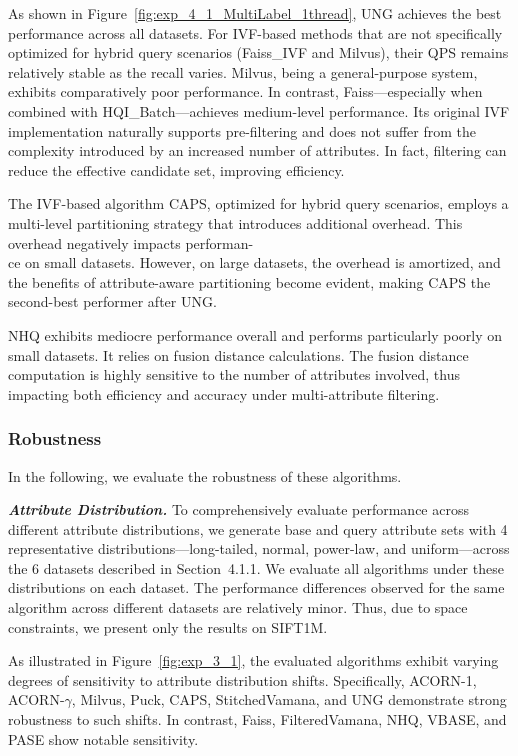 \documentclass[sigconf, nonacm]{acmart}
\begin{document}
As shown in Figure~\ref{fig:exp_4_1_MultiLabel_1thread}, UNG achieves the best performance across all datasets. For IVF-based methods that are not specifically optimized for hybrid query scenarios (Faiss\_IVF and Milvus), their QPS remains relatively stable as the recall varies. Milvus, being a general-purpose system, exhibits comparatively poor performance. In contrast, Faiss—especially when combined with HQI\_Batch—achieves medium-level performance. Its original IVF implementation naturally supports pre-filtering and does not suffer from the complexity introduced by an increased number of attributes. In fact, filtering can reduce the effective candidate set, improving efficiency.

The IVF-based algorithm CAPS, optimized for hybrid query scenarios, employs a multi-level partitioning strategy that introduces additional overhead. This overhead negatively impacts performan-\\ce on small datasets. However, on large datasets, the overhead is amortized, and the benefits of attribute-aware partitioning become evident, making CAPS the second-best performer after UNG.

NHQ exhibits mediocre performance overall and performs particularly poorly on small datasets. It relies on fusion distance calculations. The fusion distance computation is highly sensitive to the number of attributes involved, thus impacting both efficiency and accuracy under multi-attribute filtering.




\subsubsection{Robustness}In the following, we evaluate the robustness of these algorithms.

\textit{\textbf{Attribute Distribution.}} To comprehensively evaluate performance across different attribute distributions, we generate base and query attribute sets with 4 representative distributions—long-tailed, normal, power-law, and uniform—across the 6 datasets described in Section~4.1.1. We evaluate all algorithms under these distributions on each dataset. The performance differences observed for the same algorithm across different datasets are relatively minor. Thus, due to space constraints, we present only the results on SIFT1M.

As illustrated in Figure~\ref{fig:exp_3_1}, the evaluated algorithms exhibit varying degrees of sensitivity to attribute distribution shifts. Specifically, ACORN-1, ACORN-$\gamma$, Milvus, Puck, CAPS, StitchedVamana, and UNG demonstrate strong robustness to such shifts. In contrast, Faiss, FilteredVamana, NHQ, VBASE, and PASE show notable sensitivity.
\end{document}
